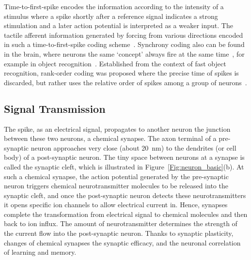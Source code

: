 Time-to-first-spike encodes the information according to the intensity of a stimulus where a spike shortly after a reference signal indicates a strong stimulation and a later action potential is interpreted as a weaker input.
The tactile afferent information generated by forcing \DIFdelbegin {}\DIFdelend \DIFaddbegin {}\DIFaddend from various directions \DIFdelbegin {}\DIFdelend \DIFaddbegin {}\DIFaddend encoded in such a time-to-first-spike coding scheme~\citep{johansson2004first}.
Synchrony coding also can be found in the brain, where neurons \DIFdelbegin {}\DIFdelend \DIFaddbegin {}\DIFaddend the same `concept' always fire at the same time~\citep{von1994correlation}, for example in object recognition~\citep{gray1989stimulus}.
Established from the context of fast object recognition, rank-order coding was proposed where the precise time of spikes is discarded, but rather uses the relative order of spikes among a group of neurons~\citep{gautrais1998rate}.


\subsection{Signal Transmission}
\label{subsec:spike_trans}
The spike, as an electrical signal, propagates to another neuron \DIFdelbegin {}\DIFdelend \DIFaddbegin {}\DIFaddend the junction between these two neurons, a chemical synapse.
The axon terminal of a pre-synaptic neuron approaches very close (\DIFaddbegin {}\DIFaddend about 20~nm) to the dendrites (or cell body) of a  post-synaptic neuron.
The tiny space between neurons at a synapse is called the synaptic cleft, which is illustrated in Figure~\ref{Fig:neuron_basic}(b).
At such a chemical synapse, the action potential generated by the pre-synaptic neuron triggers chemical neurotransmitter molecules to be released into the synaptic cleft, and once the post-synaptic neuron detects these neurotransmitters it opens specific ion channels to allow electrical current in.
Hence, synapses complete the transformation from electrical signal to chemical molecules and then back to ion influx.
The amount of neurotransmitter determines the strength of the current flow into the post-synaptic neuron.
Thanks to synaptic plasticity, changes of chemical synapses \DIFdelbegin {}\DIFdelend \DIFaddbegin {}\DIFaddend the synaptic efficacy, and \DIFdelbegin {}\DIFdelend \DIFaddbegin {}\DIFaddend the neuronal correlation of learning and memory.

